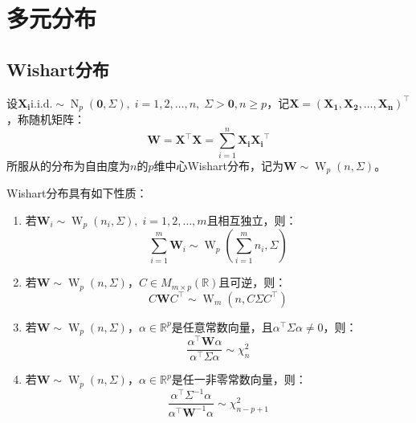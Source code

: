 \section{多元分布}

\subsection{Wishart分布}
\begin{definition}
	设$\mathbf{X_i}\text{i.i.d.}\sim\operatorname{N}_p(\mathbf{0},\Sigma),\;i=1,2,\dots,n,\;\Sigma>\mathbf{0},n\geqslant p$，记$\mathbf{X}=(\mathbf{X_1},\mathbf{X_2},\dots,\mathbf{X_n})^{\top}$，称随机矩阵：
	\begin{equation*}
		\mathbf{W}=\mathbf{X}^{\top}\mathbf{X}=\sum_{i=1}^{n}\mathbf{X_i}\mathbf{X_i}^{\top}
	\end{equation*}
	所服从的分布为自由度为$n$的$p$维中心Wishart分布，记为$\mathbf{W}\sim\operatorname{W}_p(n,\Sigma)$。
\end{definition}
\begin{property}\label{prop:Wishart}
	Wishart分布具有如下性质：
	\begin{enumerate}
		\item 若$\mathbf{W}_i\sim\operatorname{W}_p(n_i,\Sigma),\;i=1,2,\dots,m$且相互独立，则：
		\begin{equation*}
			\sum_{i=1}^{m}\mathbf{W}_i\sim\operatorname{W}_p\left(\sum_{i=1}^{m}n_i,\Sigma\right)
		\end{equation*}
		\item 若$\mathbf{W}\sim\operatorname{W}_p(n,\Sigma)$，$C\in M_{m\times p}(\mathbb{R})$且可逆，则：
		\begin{equation*}
			C\mathbf{W}C^{\top}\sim\operatorname{W}_m(n, C\Sigma C^{\top})
		\end{equation*}
		\item 若$\mathbf{W}\sim\operatorname{W}_p(n,\Sigma)$，$\alpha\in\mathbb{R}^{p}$是任意常数向量，且$\alpha^{\top}\Sigma\alpha\ne0$，则：
		\begin{equation*}
			\frac{\alpha^{\top}\mathbf{W}\alpha}{\alpha^{\top}\Sigma\alpha}\sim\chi_n^2
		\end{equation*}
		\item 若$\mathbf{W}\sim\operatorname{W}_p(n,\Sigma)$，$\alpha\in\mathbb{R}^{p}$是任一非零常数向量，则：
		\begin{equation*}
			\frac{\alpha^{\top}\Sigma^{-1}\alpha}{\alpha^{\top}\mathbf{W}^{-1}\alpha}\sim\chi_{n-p+1}^2
		\end{equation*}
	\end{enumerate}
\end{property}
